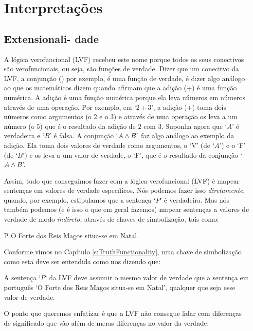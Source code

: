 \part{Interpretações}
\label{ch.semantics}


\chapter[Extensionalidade]{Extensionali- dade}\label{s:Interpretations}

A lógica verofuncional (LVF) recebeu este nome porque todos os seus conectivos são verofuncionais, ou seja, são funções de verdade.
Dizer que um conecitvo da LVF, a conjunção (\eand) por exemplo, é uma função de verdade, é dizer algo análogo ao que os matemáticos dizem quando afirmam que a adição ($+$) é uma função numérica.
A adição é uma função numérica porque ela leva números em números através de uma operação.
Por exemplo, em  `$2+3$', a adição ($+$) toma dois números como argumentos (o $2$ e o $3$) e através de uma operação os leva a um número (o $5$) que é o resultado da adição de $2$ com $3$.
Suponha agora que `$A$' é verdadeira e `$B$' é falsa. A conjunção `$A\wedge B$' faz algo análogo ao exemplo da adição.
Ela toma dois valores de verdade como argumentos, o `V' (de `$A$') e o `F' (de `$B$') e os leva a um valor de verdade, o `F', que é o resultado da conjunção `$A\wedge B$'.

Assim, tudo que conseguimos fazer com a lógica verofuncional (LVF) é mapear sentenças em valores de verdade específicos.
Nós podemos fazer isso \emph{diretamente}, quando, por exemplo, estipulamos que a sentença `$P$' é verdadeira.
Mas nós também podemos (e é isso o que em geral fazemos) mapear sentenças a valores de verdade de modo \emph{indireto}, através de chaves de simbolização, tais como:
	\begin{ekey}
		\item[P] O Forte dos Reis Magos situa-se em Natal.
	\end{ekey}
Conforme vimos no Capítulo \ref{s:TruthFunctionality}, uma chave de simbolização como esta deve ser entendida como nos dizendo que:
	\begin{ebullet}
		\item A sentença `$P$' da LVF deve assumir o mesmo valor de verdade que a sentença em português `O Forte dos Reis Magos situa-se em Natal', qualquer que seja esse valor de verdade.
	\end{ebullet}
O ponto que queremos enfatizar é que a LVF não consegue lidar com diferenças de significado que vão além de meras diferenças no valor da verdade.


